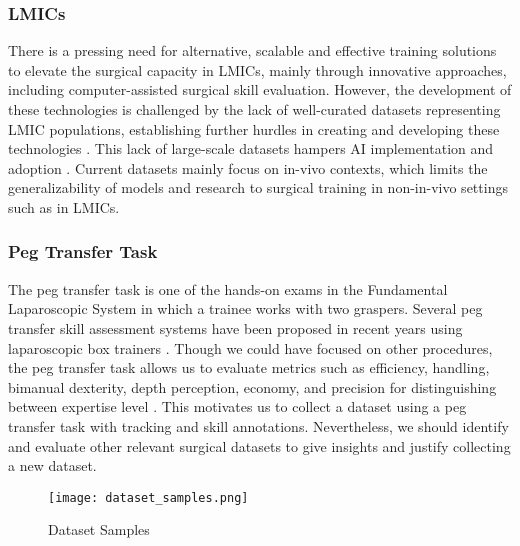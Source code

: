 \subsubsection{LMICs}

There is a pressing need for alternative, scalable and effective training solutions to elevate the surgical capacity in LMICs, mainly through innovative approaches, including computer-assisted surgical skill evaluation. However, the development of these technologies is challenged by the lack of well-curated datasets representing LMIC populations, establishing further hurdles in creating and developing these technologies \cite{maier-hein_surgical_2022, organization_health_2016}. This lack of large-scale datasets hampers AI implementation and adoption \cite{nwoye_cholectrack20_2023, ali2023comprehensivesurveyrecentdeep}. Current datasets mainly focus on in-vivo contexts, which limits the generalizability of models and research to surgical training in non-in-vivo settings such as in LMICs. 

\subsubsection{Peg Transfer Task}

The peg transfer task is one of the hands-on exams in the Fundamental Laparoscopic System \cite{maciel_development_2008, matsumoto_laparoscopic_2022, Rashidi_Fathabadi_Grantner_Shebrain_Abdel} in which a trainee works with two graspers. Several peg transfer skill assessment systems have been proposed in recent years using laparoscopic box trainers \cite{Rashidi_Fathabadi_Grantner_Shebrain_Abdel, fathabadi_surgical_2021, fathabadi_surgical_2021-1, fathabadi_fuzzy_2022}. Though we could have focused on other procedures, the peg transfer task allows us to evaluate metrics such as efficiency, handling, bimanual dexterity, depth perception, economy, and precision for distinguishing between expertise level \cite{castillo-segura_objective_2021}. This motivates us to collect a dataset using a peg transfer task with tracking and skill annotations. Nevertheless, we should identify and evaluate other relevant surgical datasets to give insights and justify collecting a new dataset.

\begin{figure}[htbp]
    \centering
    \vspace*{-2mm}
    \texttt{[image: dataset\_samples.png]}
    \vspace*{-8mm}
    \caption{Dataset Samples}
    \vspace*{-4mm}
    \label{fig:dataset_samples}
\end{figure}

